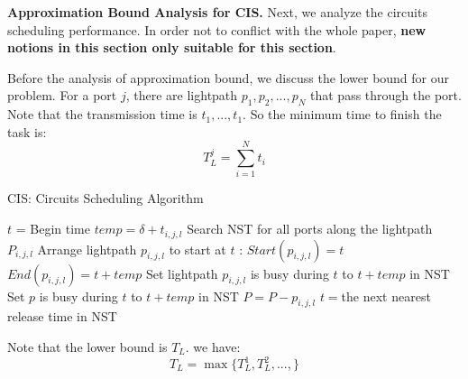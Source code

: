 \textbf{Approximation Bound Analysis for CIS.} Next, we analyze the circuits scheduling performance. In order not to conflict with the whole paper, \textbf{new notions in this section only suitable for this section}.

Before the analysis of approximation bound, we discuss the lower bound for our problem. For a port $j$, there are lightpath $p_1,p_2,...,p_N$ that pass through the port. Note that the transmission time is $t_1,...,t_1$. So the minimum time to finish the task is:
 \begin{equation}\label{eq:T_L}
 T_L^j=\sum\limits_{i=1}^{N}t_i
 \end{equation}

\begin{algorithm}
\caption{CIS: Circuits Scheduling Algorithm}\label{alg:CIS}
\begin{algorithmic}[3]
	\STATE $t$ = Begin time
	\STATE $temp=\delta+t_{i,j,l}$
	\STATE Search NST for all ports along the lightpath $P_{i,j,l}$
	\STATE Arrange lightpath $p_{i,j,l}$ to start at $t$ :
	\STATE $Start(p_{i,j,l})=t$
	\STATE $End(p_{i,j,l})=t+temp$
	\STATE Set lightpath $p_{i,j,l}$ is busy during $t$ to $t+temp$ in NST
	\STATE Set $p$ is busy during $t$ to $t+temp$ in NST
	\ENDFOR
	\STATE $P=P-p_{i,j,l}$
	\ENDIF
	\ENDFOR
	\STATE $t=$the next nearest release time in NST
	\ENDWHILE
\end{algorithmic}
\end{algorithm}



Note that the lower bound is $T_L$. we have:
\begin{equation}
T_L=\max\{T_L^1,T_L^2,...,\}
\end{equation}

